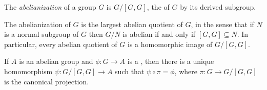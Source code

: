 \documentclass[12pt]{article}
\begin{document}

The \emph{abelianization} of a group $G$ is $G/[G,G]$, the  of $G$ by its derived subgroup.

The abelianization of $G$ is the largest abelian quotient of $G$, in the sense that if $N$ is a normal subgroup of $G$ then $G/N$ is abelian if and only if $[G,G]\subseteq N$.
In particular, every abelian quotient of $G$ is a homomorphic image of $G/[G,G]$.

If $A$ is an abelian group and $\phi\colon G\to A$ is a ,
then there is a unique homomorphism $\psi\colon G/[G,G]\to A$ such that
$\psi\circ\pi=\phi$, where $\pi\colon G\to G/[G,G]$ is the canonical projection.
\end{document}
